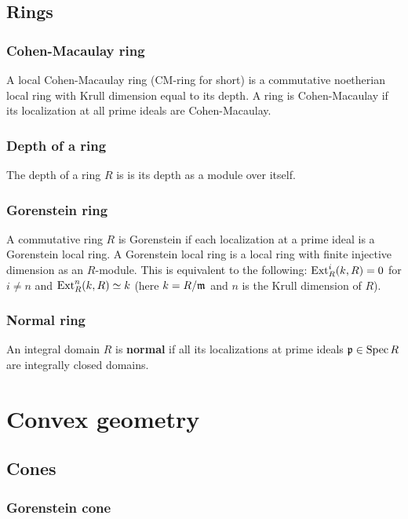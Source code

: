 \documentclass[11pt, english]{article}
\begin{document}
\subsection{Rings}
\subsubsection{Cohen-Macaulay ring}
\label{cmring}
A local Cohen-Macaulay ring (CM-ring for short) is a commutative noetherian local ring with Krull dimension equal to its depth. A ring is Cohen-Macaulay if its localization at all prime ideals are Cohen-Macaulay.

\subsubsection{Depth of a ring}

The depth of a ring $R$ is is its depth as a module over itself.

\subsubsection{Gorenstein ring}

A commutative ring $R$ is Gorenstein if each localization at a prime ideal is a Gorenstein local ring. A Gorenstein local ring is a local ring with finite injective dimension as an $R$-module. This is equivalent to the following: $\operatorname{\mathrm{Ext}}_R^i(k,R)=0$ for $i \neq n$ and $\operatorname{\mathrm{Ext}}_R^n(k,R) \simeq k$ (here $k = R/\mathfrak{m}$ and $n$ is the Krull dimension of $R$).

\subsubsection{Normal ring}
\label{normalring}

An integral domain $R$ is \textbf{normal} if all its localizations at prime ideals ${\mathfrak{p} \in \operatorname{Spec} R}$ are integrally closed domains.  

\section{Convex geometry}
\subsection{Cones}
\subsubsection{Gorenstein cone}
\label{gorensteincone}
\end{document}
